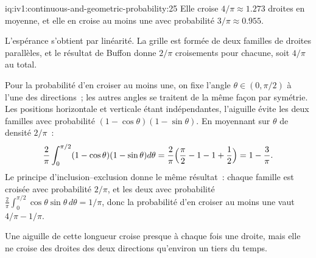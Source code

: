 \begin{solution}{iq:iv1:continuous-and-geometric-probability:25}
Elle croise $4/\pi \approx 1.273$ droites en moyenne, et elle en croise au moins une avec probabilité $3/\pi \approx 0.955$.

L'espérance s'obtient par linéarité. La grille est formée de deux familles de droites parallèles, et le résultat de Buffon donne $2/\pi$ croisements pour chacune, soit $4/\pi$ au total.

Pour la probabilité d'en croiser au moins une, on fixe l'angle $\theta \in (0, \pi/2)$ à l'une des directions~; les autres angles se traitent de la même façon par symétrie. Les positions horizontale et verticale étant indépendantes, l'aiguille évite les deux familles avec probabilité $(1 - \cos\theta)(1 - \sin\theta)$. En moyennant sur $\theta$ de densité $2/\pi$~:
\[
\frac{2}{\pi} \int_0^{\pi/2} (1 - \cos\theta)(1 - \sin\theta) d\theta = \frac{2}{\pi}\Bigl(\frac{\pi}{2} - 1 - 1 + \frac12\Bigr) = 1 - \frac{3}{\pi}.
\]
Le principe d'inclusion--exclusion donne le même résultat~: chaque famille est croisée avec probabilité $2/\pi$, et les deux avec probabilité $\frac{2}{\pi}\int_0^{\pi/2}\cos\theta\sin\theta\, d\theta = 1/\pi$, donc la probabilité d'en croiser au moins une vaut $4/\pi - 1/\pi$.

Une aiguille de cette longueur croise presque à chaque fois une droite, mais elle ne croise des droites des deux directions qu'environ un tiers du temps.

\end{solution}
